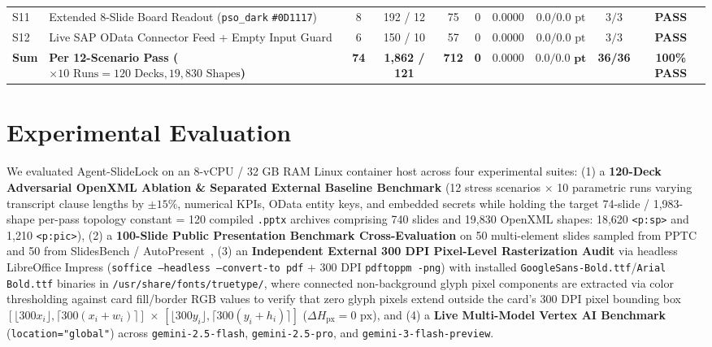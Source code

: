\documentclass[10pt,journal,compsoc]{IEEEtran}
\begin{document}
\begin{table}[t]
{\begin{tabular}{llcccccccc}
S11 & Extended 8-Slide Board Readout (\texttt{pso\_dark} \texttt{\#0D1117}) & 8 & 192 / 12 & 75 & 0 & $0.0000$ & $0.0 / 0.0\text{ pt}$ & $3/3$ & \textbf{PASS} \\
S12 & Live SAP OData Connector Feed + Empty Input Guard & 6 & 150 / 10 & 57 & 0 & $0.0000$ & $0.0 / 0.0\text{ pt}$ & $3/3$ & \textbf{PASS} \\
\midrule
\textbf{Sum} & \textbf{Per 12-Scenario Pass ($\times 10\text{ Runs} = 120\text{ Decks}, 19{,}830\text{ Shapes}$)} & \textbf{74} & \textbf{1,862 / 121} & \textbf{712} & \textbf{0} & $\mathbf{0.0000}$ & $\mathbf{0.0 / 0.0\text{ pt}}$ & \textbf{36/36} & \textbf{100\% PASS} \\
\bottomrule
\end{tabular}%
}
\end{table}

\section{Experimental Evaluation}
\label{sec:eval}

We evaluated Agent-SlideLock on an 8-vCPU / 32 GB RAM Linux container host across four experimental suites: (1) a \textbf{120-Deck Adversarial OpenXML Ablation \& Separated External Baseline Benchmark} (12 stress scenarios $\times$ 10 parametric runs varying transcript clause lengths by $\pm 15\%$, numerical KPIs, OData entity keys, and embedded secrets while holding the target 74-slide / 1,983-shape per-pass topology constant = 120 compiled \texttt{.pptx} archives comprising 740 slides and 19,830 OpenXML shapes: 18,620 \texttt{<p:sp>} and 1,210 \texttt{<p:pic>}), (2) a \textbf{100-Slide Public Presentation Benchmark Cross-Evaluation} on 50 multi-element slides sampled from PPTC~\cite{guo2024pptc} and 50 from SlidesBench / AutoPresent~\cite{ge2025autopresent}, (3) an \textbf{Independent External 300 DPI Pixel-Level Rasterization Audit} via headless LibreOffice Impress (\texttt{soffice --headless --convert-to pdf} + 300 DPI \texttt{pdftoppm -png}) with installed \texttt{GoogleSans-Bold.ttf}/\texttt{Arial Bold.ttf} binaries in \texttt{/usr/share/fonts/truetype/}, where connected non-background glyph pixel components are extracted via color thresholding against card fill/border RGB values to verify that zero glyph pixels extend outside the card's 300 DPI pixel bounding box $[\lfloor 300 x_i \rfloor, \allowbreak \lceil 300(x_i + w_i) \rceil]$ $\times$ $[\lfloor 300 y_i \rfloor, \allowbreak \lceil 300(y_i + h_i) \rceil]$ ($\Delta H_{\text{px}} = 0\text{ px}$), and (4) a \textbf{Live Multi-Model Vertex AI Benchmark} (\texttt{location="global"}) across \texttt{gemini-2.5-flash}, \texttt{gemini-2.5-pro}, and \texttt{gemini-3-flash-preview}.
\end{document}
